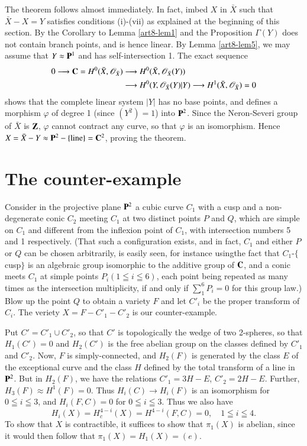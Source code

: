 The theorem follows almost immediately. In fact, imbed $X$ in $\bar{X}$ such that $\bar{X} - X = Y$ satisfies conditions (i)-(vii) as explained at the beginning of this section.  By the Corollary to Lemma \ref{art8-lem1} and the Proposition $\Gamma (Y)$ does not contain branch points, and is hence linear. By Lemma \ref{art8-lem5}, we may assume that $Y \approx \mathbf{P}^1$ and has self-intersection 1. The exact sequence
\begin{align*}
0 \longrightarrow \mathbf{C} = H^0 (\bar{X}, \mathscr{O}_{\bar{X}}) & \longrightarrow  H^0 (\bar{X}, \mathscr{O}_{\bar{X}} (Y))\\
& \longrightarrow H^0 (Y, \mathscr{O}_{\bar{X}} (Y)|Y) \longrightarrow  H^1 (\bar{X}, \mathscr{O}_{\bar{X}}) = 0 
\end{align*}
shows that the complete linear system $|Y|$ has no base points, and defines a morphism $\varphi$ of degree 1 (since $(Y^2) =1$) into $\mathbf{P}^2$. Since the Neron-Severi group of $\bar{X}$ is $\mathbf{Z}$, $\varphi$ cannot contract any curve, so that $\varphi$ is an isomorphism. Hence $X = \bar{X} - Y \approx \mathbf{P}^2 - \{\text{line}\} = \mathbf{C}^2$, proving the theorem.

\section{The counter-example}\label{art8-sec3}%

Consider in the projective plane $\mathbf{P}^2$ a cubic curve $C_1$ with a cusp and a non-degenerate conic $C_2$ meeting $C_1$ at two distinct points $P$ and $Q$, which are simple on $C_1$ and different from the inflexion point of $C_1$, with intersection numbers 5 and 1 respectively. (That such a configuration exists, and in fact, $C_1$ and either $P$ or $Q$ can be chosen arbitrarily, is easily seen, for instance using\pageoriginale the fact that $C_1$-$\{$cusp$\}$
is an algebraic group isomorphic to the additive group of $\mathbf{C}$, and a conic meets $C_1$ at simple points $P_i (1 \leqq i \leqq 6)$, each point being repeated as many times as the intersection multiplicity, if and only if $\sum^6_1 P_i = 0$ for this group law.) Blow up the point $Q$ to obtain a variety $F$ and let $C'_i$ be the proper transform of $C_i$. The veriety $X=F-C'_1-C'_2$ is our counter-example.

Put $C' = C'_1 \cup C'_2$, so that $C'$ is topologically the wedge of two 2-spheres, so that $H_1 (C') =0$ and $H_2 (C')$ is the free abelian group on the classes defined by $C'_1$ and $C'_2$. Now, $F$ is simply-connected, and $H_2 (F)$ is generated by the class $E$ of the exceptional curve and the class $H$ defined by the total transform of a line in $\mathbf{P}^2$. But in $H_2(F)$, we have the relations $C'_1 = 3 H- E$, $C'_2 = 2 H-E$. Further, $H_3 (F) \approx H^1 (F) =0$. Thus $H_i(C) \to H_i (F)$ is an isomorphism for $0 \leqq i \leqq 3$, and $H_i (F,C) =0$ for $0 \leqq i \leqq 3$. Thus we also have
$$
H_i(X) = H^{4-i}_c(X) = H^{4-i} (F,C) =0, \quad 1 \leqq i \leqq 4. 
$$
To show that $X$ is contractible, it suffices to show that $\pi_1 (X)$ is abelian, since it would then follow that $\pi_1 (X) = H_1 (X) = (e)$.

